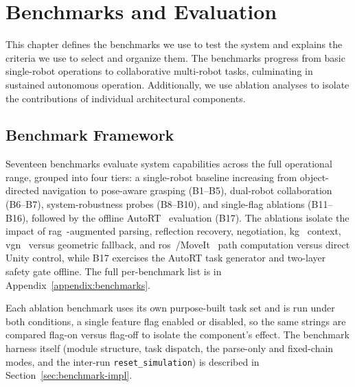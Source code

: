 \chapter{Benchmarks and Evaluation}\label{evaluation}
This chapter defines the benchmarks we use to test the system and explains the criteria we use to select and organize them. The benchmarks progress from basic single-robot operations to collaborative multi-robot tasks, culminating in sustained autonomous operation. Additionally, we use ablation analyses to isolate the contributions of individual architectural components.

\section{Benchmark Framework}\label{sec:benchmark-framework}
Seventeen benchmarks evaluate system capabilities across the full operational range, grouped into four tiers: a single-robot baseline increasing from object-directed navigation to pose-aware grasping (B1--B5), dual-robot collaboration (B6--B7), system-robustness probes (B8--B10), and single-flag ablations (B11--B16), followed by the offline AutoRT~\cite{ahn2024autortembodiedfoundationmodels} evaluation (B17). The ablations isolate the impact of \gls{rag}~\cite{lewis2021retrievalaugmentedgenerationknowledgeintensivenlp}-augmented parsing, reflection recovery, negotiation, \gls{kg}~\cite{Hogan_2021} context, \gls{vgn}~\cite{breyer2021volumetricgraspingnetworkrealtime} versus geometric fallback, and \gls{ros}~\cite{Macenski_2022}/MoveIt~\cite{coleman2014reducingbarrierentrycomplex} path computation versus direct Unity control, while B17 exercises the AutoRT task generator and two-layer safety gate offline. The full per-benchmark list is in Appendix~\ref{appendix:benchmarks}.

Each ablation benchmark uses its own purpose-built task set and is run under both conditions, a single feature flag enabled or disabled, so the same strings are compared flag-on versus flag-off to isolate the component's effect. The benchmark harness itself (module structure, task dispatch, the parse-only and fixed-chain modes, and the inter-run \texttt{reset\_simulation}) is described in Section~\ref{sec:benchmark-impl}.


